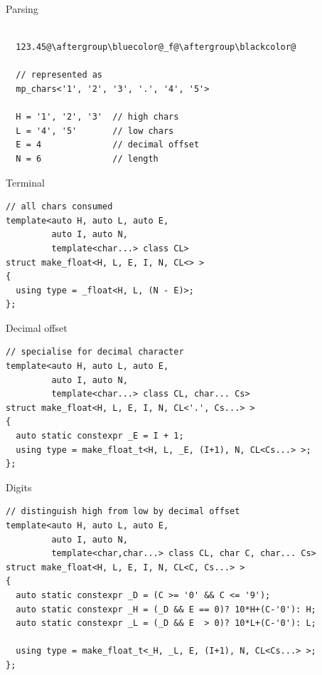 \documentclass[xcolor=dvipsnames]{beamer}
\begin{document}
\begin{frame}[fragile]{Parsing}
\begin{lstlisting}

  123.45@\aftergroup\bluecolor@_f@\aftergroup\blackcolor@

  // represented as
  mp_chars<'1', '2', '3', '.', '4', '5'>

  H = '1', '2', '3'  // high chars
  L = '4', '5'       // low chars
  E = 4              // decimal offset
  N = 6              // length

\end{lstlisting}
\end{frame}


\begin{frame}[fragile]{Terminal}
\begin{lstlisting}
// all chars consumed
template<auto H, auto L, auto E,
         auto I, auto N,
         template<char...> class CL>
struct make_float<H, L, E, I, N, CL<> >
{
  using type = _float<H, L, (N - E)>;
};
\end{lstlisting}
\end{frame}


\begin{frame}[fragile]{Decimal offset}
\begin{lstlisting}
// specialise for decimal character
template<auto H, auto L, auto E,
         auto I, auto N,
         template<char...> class CL, char... Cs>
struct make_float<H, L, E, I, N, CL<'.', Cs...> >
{
  auto static constexpr _E = I + 1;
  using type = make_float_t<H, L, _E, (I+1), N, CL<Cs...> >;
};
\end{lstlisting}
\end{frame}


\begin{frame}[fragile]{Digits}
\begin{lstlisting}
// distinguish high from low by decimal offset
template<auto H, auto L, auto E,
         auto I, auto N,
         template<char,char...> class CL, char C, char... Cs>
struct make_float<H, L, E, I, N, CL<C, Cs...> >
{
  auto static constexpr _D = (C >= '0' && C <= '9');
  auto static constexpr _H = (_D && E == 0)? 10*H+(C-'0'): H;
  auto static constexpr _L = (_D && E  > 0)? 10*L+(C-'0'): L;

  using type = make_float_t<_H, _L, E, (I+1), N, CL<Cs...> >;
};
\end{lstlisting}
\end{frame}
\end{document}
